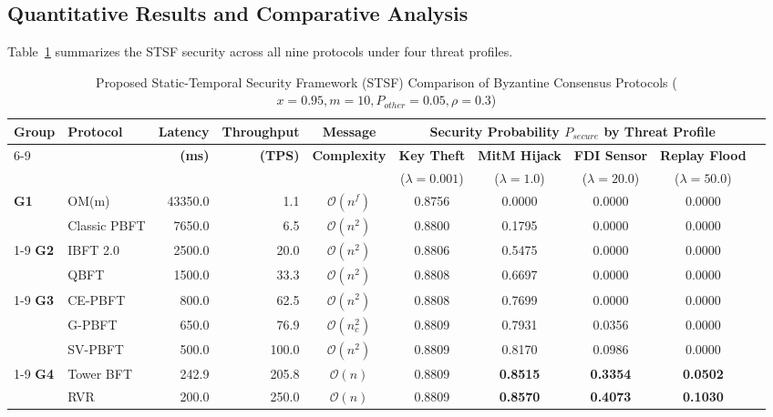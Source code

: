 \documentclass[10pt,twocolumn,letterpaper]{article}
\begin{document}
\begin{enumerate}[leftmargin=*]
\subsection{Quantitative Results and Comparative Analysis}
Table~\ref{tab:comparison} summarizes the STSF security across all nine protocols under four threat profiles.
\begin{table}[t]
\caption{Proposed Static-Temporal Security Framework (STSF) Comparison of Byzantine Consensus Protocols ($x=0.95, m=10, P_{other}=0.05, \rho=0.3$)}
\label{tab:comparison}
\centering
\scriptsize
\begin{tabular}{@{}llrrcccccc@{}}
\toprule
\multirow{2}{*}{\textbf{Group}} & \multirow{2}{*}{\textbf{Protocol}} & \multirow{2}{*}{\textbf{Latency}} & \multirow{2}{*}{\textbf{Throughput}} & \textbf{Message} & \multicolumn{4}{c}{\textbf{Security Probability $P_{secure}$ by Threat Profile}} \\
\cmidrule(lr){6-9}
 & & \textbf{(ms)} & \textbf{(TPS)} & \textbf{Complexity} & \textbf{Key Theft} & \textbf{MitM Hijack} & \textbf{FDI Sensor} & \textbf{Replay Flood} \\
 & & & & & ($\lambda=0.001$) & ($\lambda=1.0$) & ($\lambda=20.0$) & ($\lambda=50.0$) \\
\midrule
\textbf{G1} & OM(m) & 43350.0 & 1.1 & $\mathcal{O}(n^f)$ & 0.8756 & 0.0000 & 0.0000 & 0.0000 \\
 & Classic PBFT & 7650.0 & 6.5 & $\mathcal{O}(n^2)$ & 0.8800 & 0.1795 & 0.0000 & 0.0000 \\
\cmidrule(lr){1-9}
\textbf{G2} & IBFT 2.0 & 2500.0 & 20.0 & $\mathcal{O}(n^2)$ & 0.8806 & 0.5475 & 0.0000 & 0.0000 \\
 & QBFT & 1500.0 & 33.3 & $\mathcal{O}(n^2)$ & 0.8808 & 0.6697 & 0.0000 & 0.0000 \\
\cmidrule(lr){1-9}
\textbf{G3} & CE-PBFT & 800.0 & 62.5 & $\mathcal{O}(n^2)$ & 0.8808 & 0.7699 & 0.0000 & 0.0000 \\
 & G-PBFT & 650.0 & 76.9 & $\mathcal{O}(n_c^2)$ & 0.8809 & 0.7931 & 0.0356 & 0.0000 \\
 & SV-PBFT & 500.0 & 100.0 & $\mathcal{O}(n^2)$ & 0.8809 & 0.8170 & 0.0986 & 0.0000 \\
\cmidrule(lr){1-9}
\textbf{G4} & Tower BFT & 242.9 & 205.8 & $\mathcal{O}(n)$ & 0.8809 & \textbf{0.8515} & \textbf{0.3354} & \textbf{0.0502} \\
 & RVR & 200.0 & 250.0 & $\mathcal{O}(n)$ & 0.8809 & \textbf{0.8570} & \textbf{0.4073} & \textbf{0.1030} \\
\bottomrule
\end{tabular}
\end{table}


\end{enumerate}
\end{document}
